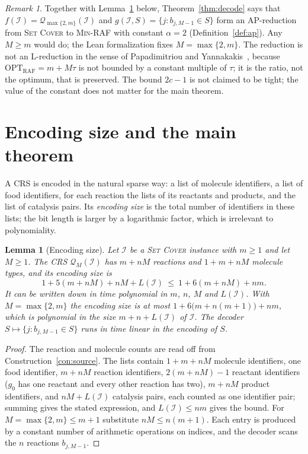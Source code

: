 \documentclass[11pt,a4paper]{article}
\theoremstyle{plain}
\newtheorem{lemma}[theorem]{Lemma}
\theoremstyle{definition}
\theoremstyle{remark}
\newtheorem{remark}[theorem]{Remark}
\newcommand{\OPT}{\mathrm{OPT}}
\newcommand{\RAF}{\mathrm{RAF}}
\newcommand{\optraf}{\OPT_{\RAF}}
\newcommand{\cQ}{\mathcal{Q}}
\newcommand{\cI}{\mathcal{I}}
\newcommand{\SetCover}{\textup{\textsc{Set Cover}}}
\newcommand{\MinRAF}{\textup{\textsc{Min-RAF}}}
\begin{document}
\begin{remark}\label{rem:ap}
Together with Lemma~\ref{lem:size} below, Theorem~\ref{thm:decode} says that $f(\cI)=\cQ_{\max\{2,m\}}(\cI)$ and $g(\cI,S)=\{j:b_{j,M-1}\in S\}$ form an AP-reduction from \SetCover{} to \MinRAF{} with constant $\alpha=2$ (Definition~\ref{def:ap}). Any $M\ge m$ would do; the Lean formalization fixes $M=\max\{2,m\}$. The reduction is not an L-reduction in the sense of Papadimitriou and Yannakakis~\cite{papadimitriou1991optimization}, because $\optraf=m+M\tau$ is not bounded by a constant multiple of $\tau$; it is the ratio, not the optimum, that is preserved. The bound $2c-1$ is not claimed to be tight; the value of the constant does not matter for the main theorem.
\end{remark}

\section{Encoding size and the main theorem}\label{sec:encoding}

A CRS is encoded in the natural sparse way: a list of molecule identifiers, a list of food identifiers, for each reaction the lists of its reactants and products, and the list of catalysis pairs. Its \emph{encoding size} is the total number of identifiers in these lists; the bit length is larger by a logarithmic factor, which is irrelevant to polynomiality.

\begin{lemma}[Encoding size]\label{lem:size}
Let $\cI$ be a \SetCover{} instance with $m\ge 1$ and let $M\ge 1$. The CRS $\cQ_M(\cI)$ has $m+nM$ reactions and $1+m+nM$ molecule types, and its encoding size is
\[
1+5(m+nM)+nM+L(\cI)\ \le\ 1+6(m+nM)+nm .
\]
It can be written down in time polynomial in $m$, $n$, $M$ and $L(\cI)$. With $M=\max\{2,m\}$ the encoding size is at most $1+6\bigl(m+n(m+1)\bigr)+nm$, which is polynomial in the size $m+n+L(\cI)$ of $\cI$. The decoder $S\mapsto\{j:b_{j,M-1}\in S\}$ runs in time linear in the encoding of $S$.
\end{lemma}

\begin{proof}
The reaction and molecule counts are read off from Construction~\ref{con:source}. The lists contain $1+m+nM$ molecule identifiers, one food identifier, $m+nM$ reaction identifiers, $2(m+nM)-1$ reactant identifiers ($g_0$ has one reactant and every other reaction has two), $m+nM$ product identifiers, and $nM+L(\cI)$ catalysis pairs, each counted as one identifier pair; summing gives the stated expression, and $L(\cI)\le nm$ gives the bound. For $M=\max\{2,m\}\le m+1$ substitute $nM\le n(m+1)$. Each entry is produced by a constant number of arithmetic operations on indices, and the decoder scans the $n$ reactions $b_{j,M-1}$.
\end{proof}
\end{document}

